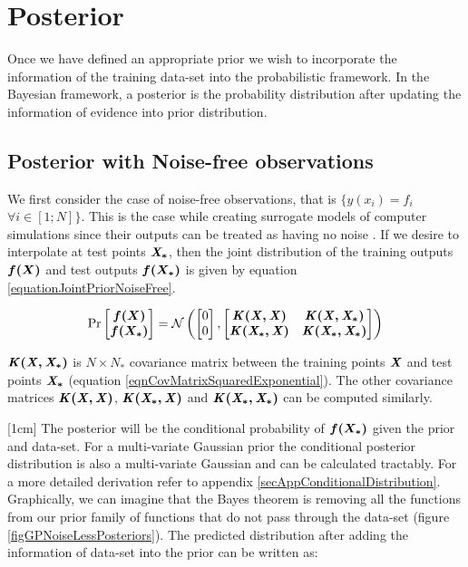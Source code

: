 \section{Posterior}\label{secPosterior}
Once we have defined an appropriate prior we wish to incorporate the information of the training data-set into the probabilistic framework. In the Bayesian framework, a posterior is the probability distribution after updating the information of evidence into prior distribution. 


\subsection{Posterior with Noise-free observations}\label{subSecPosteriorNoiseFree}
We first consider the case of noise-free observations, that is $\{ y(x_{i}) = f_{i}$ $ \forall i \in [1; N] \}$. This is the case while creating surrogate models of computer simulations since their outputs can be treated as having no noise \cite{sacks1989design}. If we desire to interpolate at test points $\bm{\mathit{X_{*}}}$, then the joint distribution of the training outputs $\boldsymbol{f(X)}$ and test outputs $\boldsymbol{f(X_{*})}$ is given by equation \ref{equationJointPriorNoiseFree}.

\begin{equation}\label{equationJointPriorNoiseFree}
\Pr\left [ \begin{matrix}
\boldsymbol{f(X)}
\\ \boldsymbol{f(X_{*})}
\end{matrix} \right ] = 
\mathcal{N}\left (\left [ \begin{matrix} 0 \\ 0 \end{matrix} \right ]
, 
\left [ \begin{matrix}
\bm{\mathit{K(X, X)}} & \bm{\mathit{K(X, X_{*})}}\\ 
\bm{\mathit{K(X_{*}, X)}} & \bm{\mathit{K(X_{*}, X_{*})}}
\end{matrix} \right ]
\right)
\end{equation}

$\bm{\mathit{K(X, X_{*})}}$ is $N \times N_{*}$ covariance matrix between the training points $\bm{\mathit{X}}$ and test points $\bm{\mathit{X_{*}}}$ (equation \ref{eqnCovMatrixSquaredExponential}). The other covariance matrices $\bm{\mathit{K(X, X)}}$, $\bm{\mathit{K(X_{*}, X)}}$ and $\bm{\mathit{K(X_{*}, X_{*})}}$ can be computed similarly. 

[1cm]
The posterior will be the conditional probability of $\boldsymbol{f(X_{*})}$ given the prior and data-set. For a multi-variate Gaussian prior the conditional posterior distribution is also a multi-variate Gaussian and can be calculated tractably. For a more detailed derivation refer to appendix \ref{secAppConditionalDistribution}. Graphically, we can imagine that the Bayes theorem is removing all the functions from our prior family of functions that do not pass through the data-set (figure \ref{figGPNoiseLessPosteriors}). The predicted distribution after adding the information of data-set into the prior can be written as:

